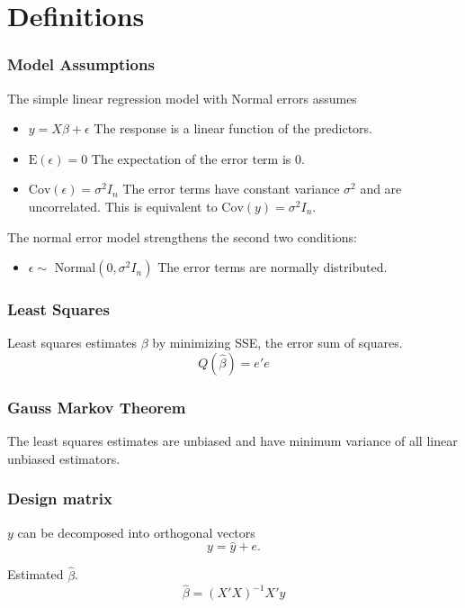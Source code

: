 \documentclass[12pt]{article}
\newcommand{\E}{\mathrm{E}}
\newcommand{\Cov}{\mathrm{Cov}}
\begin{document}
\section{Definitions}

\subsubsection{Model Assumptions}

The simple linear regression model with Normal errors assumes
\begin{itemize}
    \item $y = X \beta + \epsilon$ The response is a linear function of the predictors.
    \item $\E(\epsilon) = 0$ The expectation of the error term is 0.
    \item $\Cov(\epsilon) = \sigma^2 I_n$ The error terms have constant
variance $\sigma^2$ and are uncorrelated. This is equivalent to
$\Cov(y) = \sigma^2 I_n$.
\end{itemize}

The normal error model strengthens the second two conditions:
\begin{itemize}
    \item $\epsilon \sim $ Normal$(0, \sigma^2 I_n)$ The error terms are
normally distributed.
\end{itemize}

\subsubsection{Least Squares}

Least squares estimates $\beta$ by minimizing SSE, the error sum of
squares.
\[
    Q(\hat{\beta}) = e'e
\]

\subsubsection{Gauss Markov Theorem}

The least squares estimates are unbiased and have minimum variance of all
linear unbiased estimators.

\subsubsection{Design matrix}

$y$ can be decomposed into orthogonal vectors
\[
    y = \hat{y} + e.
\]

Estimated $\hat{\beta}$.
\[
    \hat{\beta} = (X'X)^{-1}X'y
\]
\end{document}
